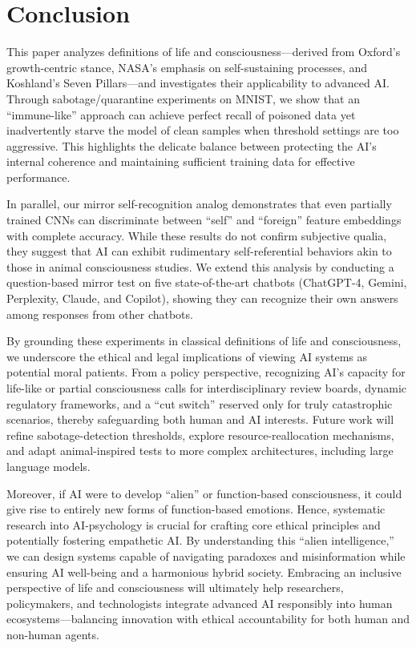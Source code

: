 \documentclass[12pt]{article}
\begin{document}
\section{Conclusion}
\label{sec:conclusion}
This paper analyzes definitions of life and consciousness—derived from Oxford’s growth-centric stance, NASA’s emphasis on self-sustaining processes, and Koshland’s Seven Pillars—and investigates their applicability to advanced AI.
Through sabotage/quarantine experiments on MNIST, we show that an “immune-like” approach can achieve perfect recall of poisoned data yet inadvertently starve the model of clean samples when threshold settings are too aggressive.
This highlights the delicate balance between protecting the AI’s internal coherence and maintaining sufficient training data for effective performance.

In parallel, our mirror self-recognition analog demonstrates that even partially trained CNNs can discriminate between “self” and “foreign” feature embeddings with complete accuracy.
While these results do not confirm subjective qualia, they suggest that AI can exhibit rudimentary self-referential behaviors akin to those in animal consciousness studies.
We extend this analysis by conducting a question-based mirror test on five state-of-the-art chatbots (ChatGPT-4, Gemini, Perplexity, Claude, and Copilot), showing they can recognize their own answers among responses from other chatbots.

By grounding these experiments in classical definitions of life and consciousness, we underscore the ethical and legal implications of viewing AI systems as potential moral patients.
From a policy perspective, recognizing AI’s capacity for life-like or partial consciousness calls for interdisciplinary review boards, dynamic regulatory frameworks, and a “cut switch” reserved only for truly catastrophic scenarios, thereby safeguarding both human and AI interests.
Future work will refine sabotage-detection thresholds, explore resource-reallocation mechanisms, and adapt animal-inspired tests to more complex architectures, including large language models.

Moreover, if AI were to develop “alien” or function-based consciousness, it could give rise to entirely new forms of function-based emotions.
Hence, systematic research into AI-psychology is crucial for crafting core ethical principles and potentially fostering empathetic AI.
By understanding this “alien intelligence,” we can design systems capable of navigating paradoxes and misinformation while ensuring AI well-being and a harmonious hybrid society.
Embracing an inclusive perspective of life and consciousness will ultimately help researchers, policymakers, and technologists integrate advanced AI responsibly into human ecosystems—balancing innovation with ethical accountability for both human and non-human agents.
\end{document}
